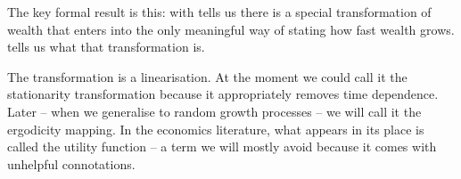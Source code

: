 The key formal result is this: with  tells us there is a special transformation of wealth that enters into the only meaningful way of stating how fast wealth grows.  tells us what that transformation is.

The transformation is a linearisation. At the moment we could call it the stationarity transformation because it appropriately removes time dependence.
Later -- when we generalise to random growth processes -- we will call it the ergodicity mapping. In the economics literature, what appears in its place is called the utility function -- a term we will mostly avoid because it comes with unhelpful connotations.

%
%
